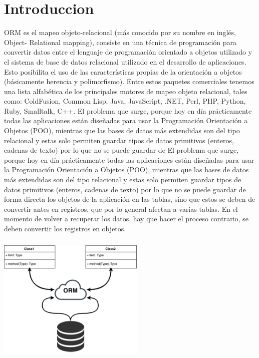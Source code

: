 \documentclass[twoside,twocolumn]{article}
\begin{document}
\section{Introduccion}

ORM es el mapeo objeto-relacional (más conocido por su nombre en inglés, Object- Relational mapping), consiste
en una técnica de programación para convertir datos entre el lenguaje de programación
orientado a objetos utilizado y el sistema de base de datos relacional utilizado en el
desarrollo de aplicaciones. Esto posibilita el uso de las características propias de la
orientación a objetos (básicamente herencia y polimorfismo). Entre estos paquetes comerciales tenemos
una lista alfabética de los principales motores de mapeo objeto relacional, tales como:
ColdFusion, Common Lisp, Java, JavaScript, .NET, Perl, PHP, Python, Ruby, Smalltalk, C++. El problema que surge, porque hoy en
día prácticamente todas las aplicaciones están diseñadas para usar la Programación
Orientación a Objetos (POO), mientras que las bases de datos más extendidas son del
tipo relacional y estas solo permiten guardar tipos de datos primitivos (enteros, cadenas
de texto) por lo que no se puede guardar de El problema que surge, porque hoy en
día prácticamente todas las aplicaciones están diseñadas para usar la Programación
Orientación a Objetos (POO), mientras que las bases de datos más extendidas son del
tipo relacional y estas solo permiten guardar tipos de datos primitivos (enteros, cadenas de texto) por lo que no se puede guardar de forma directa los objetos de la aplicación en las tablas, sino que estos se deben de convertir antes en registros, que por lo general afectan a varias tablas. En el momento de volver a recuperar los datos, hay que hacer el proceso contrario, se deben convertir los registros en objetos.
 \includegraphics[width=7cm, height=7cm]{imagenes/ORM.png}
\end{document}

